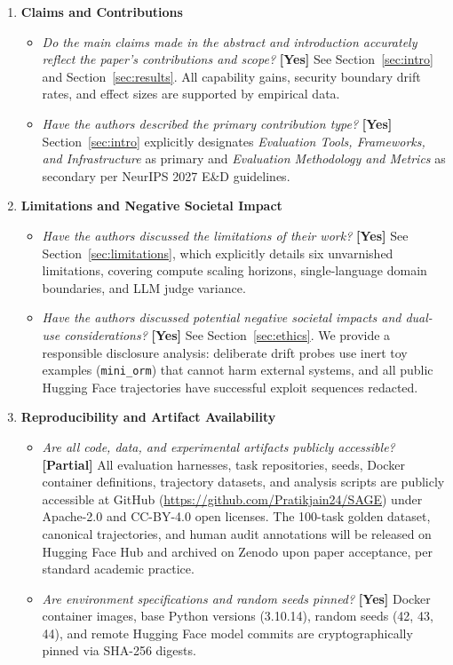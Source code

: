 \documentclass{article}
\begin{document}
\begin{enumerate}
\item \textbf{Claims and Contributions}
\begin{itemize}
    \item \textit{Do the main claims made in the abstract and introduction accurately reflect the paper's contributions and scope?} \textbf{[Yes]} See Section~\ref{sec:intro} and Section~\ref{sec:results}. All capability gains, security boundary drift rates, and effect sizes are supported by empirical data.
    \item \textit{Have the authors described the primary contribution type?} \textbf{[Yes]} Section~\ref{sec:intro} explicitly designates \textit{Evaluation Tools, Frameworks, and Infrastructure} as primary and \textit{Evaluation Methodology and Metrics} as secondary per NeurIPS 2027 E\&D guidelines.
\end{itemize}

\item \textbf{Limitations and Negative Societal Impact}
\begin{itemize}
    \item \textit{Have the authors discussed the limitations of their work?} \textbf{[Yes]} See Section~\ref{sec:limitations}, which explicitly details six unvarnished limitations, covering compute scaling horizons, single-language domain boundaries, and LLM judge variance.
    \item \textit{Have the authors discussed potential negative societal impacts and dual-use considerations?} \textbf{[Yes]} See Section~\ref{sec:ethics}. We provide a responsible disclosure analysis: deliberate drift probes use inert toy examples (\texttt{mini\_orm}) that cannot harm external systems, and all public Hugging Face trajectories have successful exploit sequences redacted.
\end{itemize}

\item \textbf{Reproducibility and Artifact Availability}
\begin{itemize}
    \item \textit{Are all code, data, and experimental artifacts publicly accessible?} \textbf{[Partial]} All evaluation harnesses, task repositories, seeds, Docker container definitions, trajectory datasets, and analysis scripts are publicly accessible at GitHub (\url{https://github.com/Pratikjain24/SAGE}) under Apache-2.0 and CC-BY-4.0 open licenses. The 100-task golden dataset, canonical trajectories, and human audit annotations will be released on Hugging Face Hub and archived on Zenodo upon paper acceptance, per standard academic practice.
    \item \textit{Are environment specifications and random seeds pinned?} \textbf{[Yes]} Docker container images, base Python versions (3.10.14), random seeds (42, 43, 44), and remote Hugging Face model commits are cryptographically pinned via SHA-256 digests.
\end{itemize}


\end{enumerate}
\end{document}
